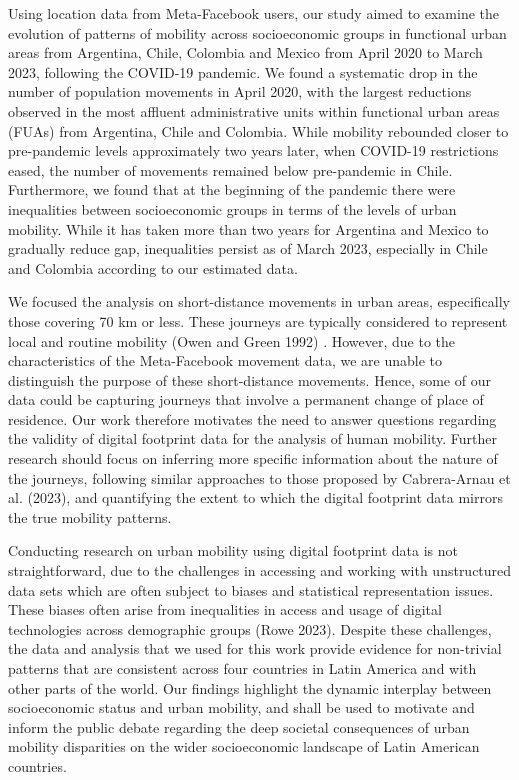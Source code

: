 \documentclass[
  11pt,
]{article}
\begin{document}
Using location data from Meta-Facebook users, our study aimed to examine
the evolution of patterns of mobility across socioeconomic groups in
functional urban areas from Argentina, Chile, Colombia and Mexico from
April 2020 to March 2023, following the COVID-19 pandemic. We found a
systematic drop in the number of population movements in April 2020,
with the largest reductions observed in the most affluent administrative
units within functional urban areas (FUAs) from Argentina, Chile and
Colombia. While mobility rebounded closer to pre-pandemic levels
approximately two years later, when COVID-19 restrictions eased, the
number of movements remained below pre-pandemic in Chile. Furthermore,
we found that at the beginning of the pandemic there were inequalities
between socioeconomic groups in terms of the levels of urban mobility.
While it has taken more than two years for Argentina and Mexico to
gradually reduce gap, inequalities persist as of March 2023, especially
in Chile and Colombia according to our estimated data.

We focused the analysis on short-distance movements in urban areas,
especifically those covering 70 km or less. These journeys are typically
considered to represent local and routine mobility (Owen and Green 1992)
. However, due to the characteristics of the Meta-Facebook movement
data, we are unable to distinguish the purpose of these short-distance
movements. Hence, some of our data could be capturing journeys that
involve a permanent change of place of residence. Our work therefore
motivates the need to answer questions regarding the validity of digital
footprint data for the analysis of human mobility. Further research
should focus on inferring more specific information about the nature of
the journeys, following similar approaches to those proposed by
Cabrera-Arnau et al. (2023), and quantifying the extent to which the
digital footprint data mirrors the true mobility patterns.

Conducting research on urban mobility using digital footprint data is
not straightforward, due to the challenges in accessing and working with
unstructured data sets which are often subject to biases and statistical
representation issues. These biases often arise from inequalities in
access and usage of digital technologies across demographic groups (Rowe
2023). Despite these challenges, the data and analysis that we used for
this work provide evidence for non-trivial patterns that are consistent
across four countries in Latin America and with other parts of the
world. Our findings highlight the dynamic interplay between
socioeconomic status and urban mobility, and shall be used to motivate
and inform the public debate regarding the deep societal consequences of
urban mobility disparities on the wider socioeconomic landscape of Latin
American countries.
\end{document}
